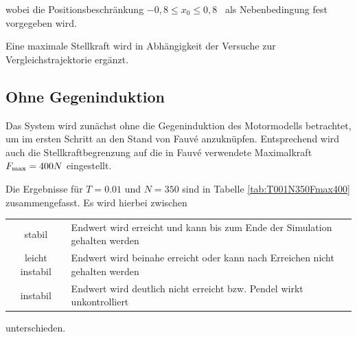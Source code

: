 wobei die Positionsbeschränkung $-0,8 \leq x_0 \leq 0,8$ \ als Nebenbedingung fest vorgegeben wird.

Eine maximale Stellkraft wird in Abhängigkeit der Versuche zur Vergleichstrajektorie ergänzt.


\subsection{Ohne Gegeninduktion}

Das System wird zunächst ohne die Gegeninduktion des Motormodells betrachtet, um im ersten Schritt an den Stand von Fauvé \cite{fauve} anzuknüpfen. Entsprechend wird auch die Stellkraftbegrenzung auf die in Fauvé \cite{fauve} verwendete Maximalkraft $F_{\mathrm{max}}=400N$ eingestellt. 

Die Ergebnisse für $T=0.01$ und $N=350$ sind in Tabelle \ref{tab:T001N350Fmax400} zusammengefasst. Es wird hierbei zwischen 

\begin{center}
	\begin{tabular}{cl}
		stabil & Endwert wird erreicht und kann bis zum Ende der Simulation gehalten werden \\
		leicht instabil & Endwert wird beinahe erreicht oder kann nach Erreichen nicht gehalten werden  \\
		instabil & Endwert wird deutlich nicht erreicht bzw. Pendel wirkt unkontrolliert\\
	\end{tabular}
\end{center}

unterschieden.

